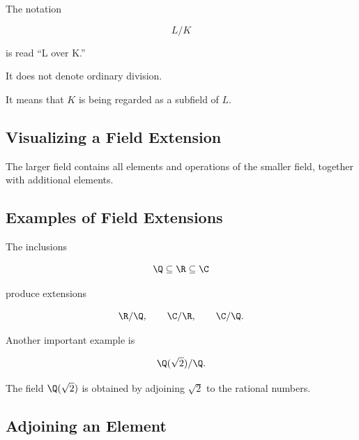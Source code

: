 The notation

\[ L/K \]

is read ``L over K.''

It does not denote ordinary division.

It means that \(K\) is being regarded as a subfield of \(L\).

\subsection{Visualizing a Field Extension}
\label{subsec:visual-field-extension}

\begin{center}
\end{center}

The larger field contains all elements and operations of the smaller field,
together with additional elements.

\subsection{Examples of Field Extensions}
\label{subsec:field-extension-examples}

The inclusions

\[ \Q\subseteq\R\subseteq\C \]

produce extensions

\[ \R/\Q,\qquad \C/\R,\qquad \C/\Q. \]

Another important example is

\[ \Q(\sqrt2)/\Q. \]

The field \(\Q(\sqrt2)\) is obtained by adjoining \(\sqrt2\) to the rational
numbers.

\subsection{Adjoining an Element}
\label{subsec:adjoining-field-element}

